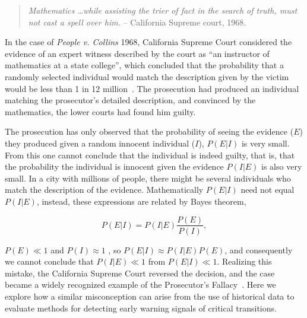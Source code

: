 \documentclass[authoryear,review,12pt]{elsarticle}
\begin{document}
\begin{quotation}
\noindent \emph{Mathematics \dots while assisting the trier of fact in the search of truth, must not cast a spell over him.}
-- California Supreme court, 1968.
\end{quotation}

\noindent In the case of \emph{People v. Collins} 1968, California Supreme
Court considered the evidence of an expert witness described by the
court as ``an instructor of mathematics at a state college'', which
concluded that the probability that a randomly selected individual
would match the description given by the victim would be less than 1 in
12 million~\citep{PeopleCollins1968}.  The prosecution had produced an
individual matching the prosecutor's detailed description, and convinced
by the mathematics, the lower courts had found him
guilty.


The prosecution has only observed that the probability of seeing the
evidence ($E$) they produced given a random innocent individual ($I$),
$P(E|I)$ is very small.  From this one cannot conclude that the individual
is indeed guilty, that is, that the probability the individual is innocent
given the evidence $P(I|E)$ is also very small. In a city with millions
of people, there might be several individuals who match the description
of the evidence.  Mathematically $P(E|I)$ need not equal $P(I|E)$,
instead, these expressions are related by Bayes theorem,

\begin{equation}
  P(E|I) = P(I|E) \frac{P(E)}{P(I)},
\end{equation} 

$P(E) \ll 1$ and $P(I)\approx 1$ , so $P(E|I) \approx P(I|E) P(E)$, and consequently we cannot conclude that $P(I|E) \ll 1$ from $P(E|I) \ll 1$.  
Realizing this mistake, the California Supreme Court reversed the decision, and
the case became a widely recognized example of the Prosecutor's
Fallacy~\citep{Thompson1987}.  Here we explore how a similar misconception
can arise from the use of historical data to evaluate methods for
detecting early warning signals of critical transitions.



\end{document}
